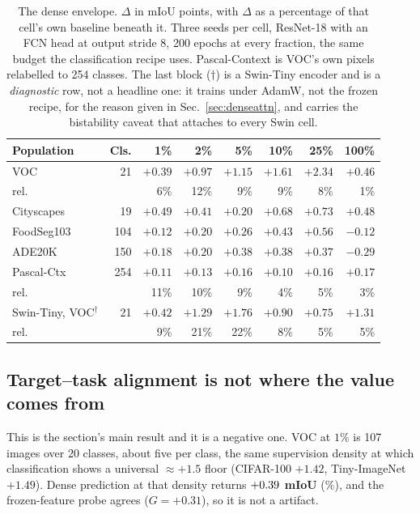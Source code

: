 \begin{table}[pos=htbp]
\caption{The dense envelope. $\Delta$ in mIoU points, with $\Delta$ as a
percentage of that cell's own baseline beneath it. Three seeds per cell,
ResNet-18 with an FCN head at output stride 8, 200 epochs at every fraction,
the same budget the classification recipe uses. Pascal-Context is VOC's own
pixels relabelled to 254 classes. The last block ($\dagger$) is a Swin-Tiny encoder and is
a \emph{diagnostic} row, not a headline one: it trains under AdamW, not the frozen recipe, for the reason given in Sec.~\ref{sec:denseattn}, and
carries the bistability caveat that attaches to every Swin cell.}
\label{tab:dense}
\centering\scriptsize
\setlength{\tabcolsep}{3.0pt}
\begin{tabular}{lrrrrrrr}
\toprule
Population & Cls. & 1\% & 2\% & 5\% & 10\% & 25\% & 100\% \\
\midrule
VOC           & 21  & $+0.39$ & $+0.97$ & $+1.15$ & $+1.61$ & $+2.34$ & $+0.46$ \\
\quad rel.    &     & 6\%     & 12\%    & 9\%     & 9\%     & 8\%     & 1\%     \\
Cityscapes    & 19  & $+0.49$ & $+0.41$ & $+0.20$ & $+0.68$ & $+0.73$ & $+0.48$ \\
FoodSeg103    & 104 & $+0.12$ & $+0.20$ & $+0.26$ & $+0.43$ & $+0.56$ & $-0.12$ \\
ADE20K        & 150 & $+0.18$ & $+0.20$ & $+0.38$ & $+0.38$ & $+0.37$ & $-0.29$ \\
Pascal-Ctx    & 254 & $+0.11$ & $+0.13$ & $+0.16$ & $+0.10$ & $+0.16$ & $+0.17$ \\
\quad rel.    &     & 11\%    & 10\%    & 9\%     & 4\%     & 5\%     & 3\%     \\
\midrule
Swin-Tiny, VOC$^{\dagger}$ & 21 & $+0.42$ & $+1.29$ & $+1.76$ & $+0.90$ & $+0.75$ & $+1.31$ \\
\quad rel.    &     & 9\%     & 21\%    & 22\%    & 8\%     & 5\%     & 5\%     \\
\bottomrule
\end{tabular}
\end{table}

\subsection{Target--task alignment is not where the value comes
from}\label{sec:densealign} This is the section's main result and it is a
negative one. VOC at $1\%$ is 107 images over 20 classes, about five per class,
the same supervision density at which classification shows a universal
${\approx}+1.5$ floor (CIFAR-100 $+1.42$, Tiny-ImageNet $+1.49$). Dense
prediction at that density returns \textbf{$+0.39$ mIoU}
(\denseVocOneRel\%), and the frozen-feature probe agrees ($G = +0.31$), so it
is not a \readout{} artifact.

